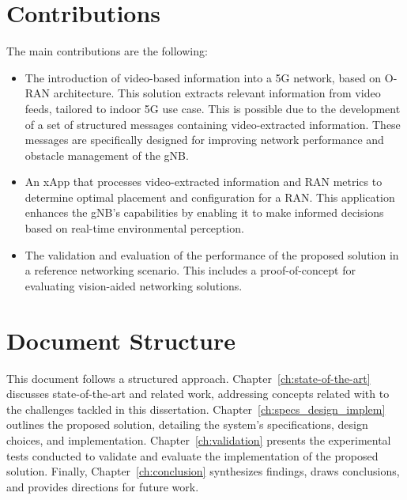 \section{Contributions}\label{sec:contributions}

The main contributions are the following:

    \begin{itemize}
    
    \item The introduction of video-based information into a 5G network, based on O-RAN architecture.
    This solution extracts relevant information from video feeds, tailored to indoor 5G use case.
    This is possible due to the development of a set of structured messages containing video-extracted information.
    These messages are specifically designed for improving network performance and obstacle management of the gNB\@.
    
    \item An xApp that processes video-extracted information and RAN metrics to determine optimal placement and configuration for a RAN\@.
    This application enhances the gNB's capabilities by enabling it to make informed decisions based on real-time environmental perception.
    
    \item The validation and evaluation of the performance of the proposed solution in a reference networking scenario.
    This includes a proof-of-concept for evaluating vision-aided networking solutions.
    
    \end{itemize}


\section{Document Structure}\label{sec:document-structure}

This document follows a structured approach.
Chapter~\ref{ch:state-of-the-art} discusses state-of-the-art and related work, addressing concepts related with to the challenges tackled in this dissertation.
Chapter~\ref{ch:specs_design_implem} outlines the proposed solution, detailing the system's specifications, design choices, and implementation.
Chapter~\ref{ch:validation} presents the experimental tests conducted to validate and evaluate the implementation of the proposed solution.
Finally, Chapter~\ref{ch:conclusion} synthesizes findings, draws conclusions, and provides directions for future work.